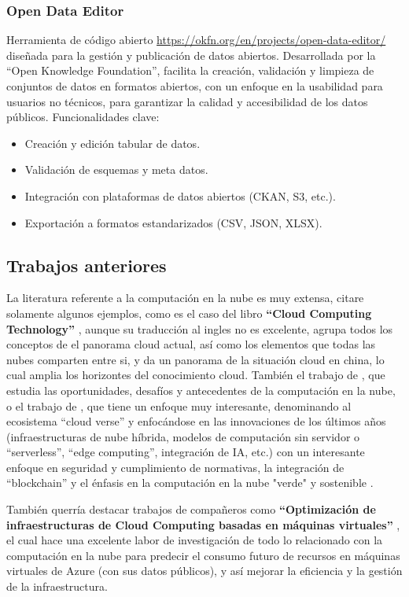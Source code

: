 \subsubsection*{Open Data Editor}
	Herramienta de código abierto \url{https://okfn.org/en/projects/open-data-editor/} diseñada para la gestión y publicación de datos abiertos. Desarrollada por la ``Open Knowledge Foundation'', facilita la creación, validación y limpieza de conjuntos de datos en formatos abiertos, con un enfoque en la usabilidad para usuarios no técnicos, para garantizar la calidad y accesibilidad de los datos públicos. Funcionalidades clave:
	\begin{itemize}
		\item Creación y edición tabular de datos.
		\item Validación de esquemas y meta datos.
		\item Integración con plataformas de datos abiertos (CKAN, S3, etc.).
		\item Exportación a formatos estandarizados (CSV, JSON, XLSX).
	\end{itemize}


	\subsection{Trabajos anteriores}

	La literatura referente a la computación en la nube es muy extensa, citare solamente algunos ejemplos, como es el caso del libro \textbf{``Cloud Computing Technology''} \citep{huawei2023cloud}, aunque su traducción al ingles no es excelente, agrupa todos los conceptos de el panorama cloud actual, así como los elementos que todas las nubes comparten entre si, y da un panorama de la situación cloud en china, lo cual amplia los horizontes del conocimiento cloud. También el trabajo de \citep{nigro2022}, que estudia las oportunidades, desafíos y antecedentes de la computación en la nube, o el trabajo de \citep{bommala2024}, que tiene un enfoque muy interesante, denominando al ecosistema ``cloud verse'' y enfocándose en las innovaciones de los últimos años (infraestructuras de nube híbrida, modelos de computación sin servidor o ``serverless'', ``edge computing'', integración de IA, etc.) con un interesante  enfoque en seguridad y cumplimiento de normativas, la integración de ``blockchain'' y el énfasis en la computación en la nube "verde" y sostenible . 

	También querría destacar trabajos de compañeros como \textbf{``Optimización de infraestructuras de Cloud Computing basadas en máquinas virtuales''} \citep{sanchez2023optimizacion}, el cual hace una excelente labor de investigación de todo lo relacionado con la computación en la nube para predecir el consumo futuro de recursos en máquinas virtuales de Azure (con sus datos públicos), y así mejorar la eficiencia y la gestión de la infraestructura.

